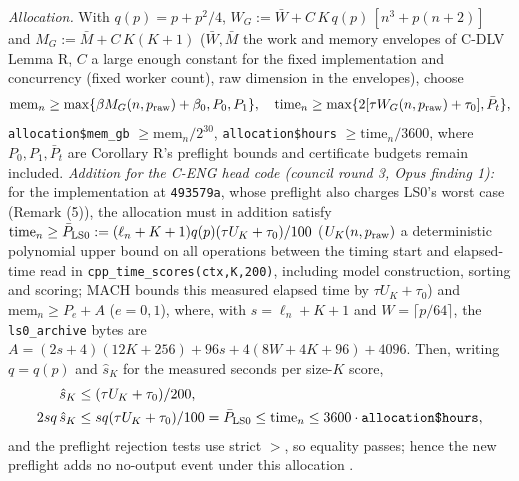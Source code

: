 \begin{proposition}
\emph{Allocation.} With $q(p)=p+p^2/4$, $W_G:=\bar{W}+C\,K\,q(p)\,[n^3+p(n+2)]$ and $M_G:=\bar{M}+C\,K(K+1)$ ($\bar{W},\bar{M}$ the work and memory envelopes of C-DLV Lemma R, $C$ a large enough constant for the fixed implementation and concurrency (fixed worker count), raw dimension in the envelopes), choose
\[
\mathrm{mem}_n\ge\max\{\beta M_G(n,p_{\rm raw})+\beta_0,P_0,P_1\},\quad \mathrm{time}_n\ge\max\{2[\tau W_G(n,p_{\rm raw})+\tau_0],\bar{P}_t\},
\]
\texttt{allocation\$mem\_gb} $\ge\mathrm{mem}_n/2^{30}$, \texttt{allocation\$hours} $\ge\mathrm{time}_n/3600$, where $P_0,P_1,\bar{P}_t$ are Corollary R's preflight bounds and certificate budgets remain included. \emph{Addition for the C-ENG head code (council round 3, Opus finding 1):} for the implementation at \texttt{493579a}, whose preflight also charges LS0's worst case (Remark (5)), the allocation must in addition satisfy $\mathrm{time}_n\ge\bar P_{\rm LS0}:=(\ell_n+K+1)q(p)(\tau U_K+\tau_0)/100$ ($U_K(n,p_{\rm raw})$ a deterministic polynomial upper bound on all operations between the timing start and elapsed-time read in \texttt{cpp\_time\_scores(ctx,K,200)}, including model construction, sorting and scoring; MACH bounds this measured elapsed time by $\tau U_K+\tau_0$) and $\mathrm{mem}_n\ge P_e+A$ ($e=0,1$), where, with $s=\ell_n+K+1$ and $W=\lceil p/64\rceil$, the \texttt{ls0\_archive} bytes are $A=(2s+4)(12K+256)+96s+4(8W+4K+96)+4096$. Then, writing $q=q(p)$ and $\hat s_K$ for the measured seconds per size-$K$ score,
\[
\begin{aligned}
\hat s_K&\le(\tau U_K+\tau_0)/200,\\
2sq\,\hat s_K&\le sq(\tau U_K+\tau_0)/100=\bar P_{\rm LS0}\le\mathrm{time}_n\le3600\cdot\texttt{allocation\$hours},
\end{aligned}
\]
and the preflight rejection tests use strict $>$, so equality passes; hence the new preflight adds no no-output event under this allocation .


\end{proposition}
